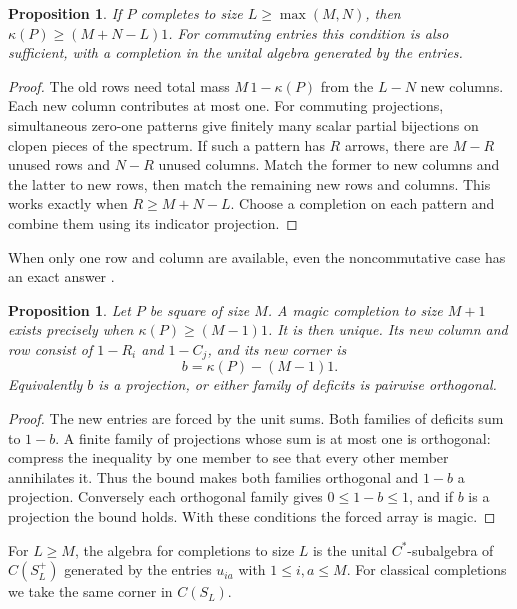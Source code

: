 \documentclass[11pt,a4paper]{article}
\newtheorem{prop}[thm]{Proposition}
\begin{document}
\begin{prop}\label{deficit}
If $P$ completes to size $L\geq\max(M,N)$, then $\kappa(P)\geq(M+N-L)1$. For commuting entries this condition is also sufficient, with a completion in the unital algebra generated by the entries.
\end{prop}
\begin{proof}
The old rows need total mass $M\,1-\kappa(P)$ from the $L-N$ new columns. Each new column contributes at most one. For commuting projections, simultaneous zero-one patterns give finitely many scalar partial bijections on clopen pieces of the spectrum. If such a pattern has $R$ arrows, there are $M-R$ unused rows and $N-R$ unused columns. Match the former to new columns and the latter to new rows, then match the remaining new rows and columns. This works exactly when $R\geq M+N-L$. Choose a completion on each pattern and combine them using its indicator projection.
\end{proof}

When only one row and column are available, even the noncommutative case has an exact answer \cite{bs}.

\begin{prop}\label{oneborder}
Let $P$ be square of size $M$. A magic completion to size $M+1$ exists precisely when $\kappa(P)\geq(M-1)1$. It is then unique. Its new column and row consist of $1-R_i$ and $1-C_j$, and its new corner is
\[
 b=\kappa(P)-(M-1)1 .
\]
Equivalently $b$ is a projection, or either family of deficits is pairwise orthogonal.
\end{prop}
\begin{proof}
The new entries are forced by the unit sums. Both families of deficits sum to $1-b$. A finite family of projections whose sum is at most one is orthogonal: compress the inequality by one member to see that every other member annihilates it. Thus the bound makes both families orthogonal and $1-b$ a projection. Conversely each orthogonal family gives $0\leq1-b\leq1$, and if $b$ is a projection the bound holds. With these conditions the forced array is magic.
\end{proof}

For $L\geq M$, the algebra for completions to size $L$ is the unital $C^*$-subalgebra of $C(S_L^+)$ generated by the entries $u_{ia}$ with $1\leq i,a\leq M$. For classical completions we take the same corner in $C(S_L)$.
\end{document}
